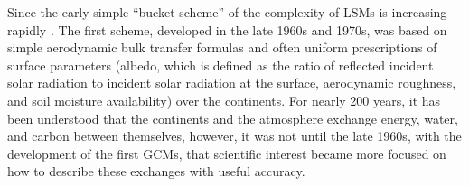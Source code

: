 

Since the early simple ``bucket scheme'' of \citet{Manabe1969} the complexity of LSMs is increasing rapidly \citep{Dickinson1983,Dai2003,vandenHurk2011}. The first scheme, developed in the late 1960s and 1970s, was based on simple aerodynamic bulk transfer formulas and often uniform prescriptions of surface parameters (albedo, which is defined as the ratio of reflected incident solar radiation to incident solar radiation at the surface, aerodynamic roughness, and soil moisture availability) over the continents. For nearly 200 years, it has been understood that the continents and the atmosphere exchange energy, water, and carbon between themselves, however, it was not until the late 1960s, with the development of the first GCMs, that scientific interest became more focused on how to describe these exchanges with useful accuracy. 

